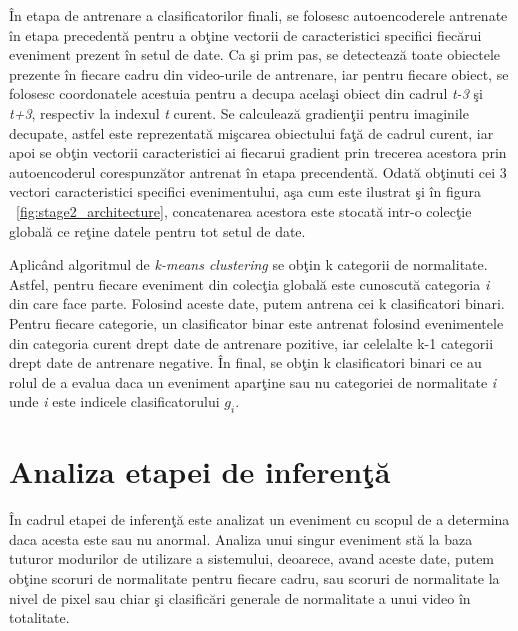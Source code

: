 \documentclass[a4paper,12pt]{report}
\begin{document}
\par
În etapa de antrenare a clasificatorilor finali, se folosesc autoencoderele antrenate în etapa precedentă pentru a obţine vectorii de caracteristici specifici fiecărui eveniment prezent în setul de date. Ca şi prim pas, se detectează toate obiectele prezente în fiecare cadru din video-urile  de antrenare, iar pentru fiecare obiect, se folosesc coordonatele acestuia pentru a decupa acelaşi obiect din cadrul \emph{t-3} şi \emph{t+3}, respectiv la indexul \emph{t} curent. Se calculează gradienţii pentru imaginile decupate, astfel este reprezentată mişcarea obiectului faţă de cadrul curent, iar apoi se obţin vectorii caracteristici ai fiecarui gradient prin trecerea acestora prin autoencoderul corespunzător antrenat în etapa precendentă. Odată obţinuti cei 3 vectori caracteristici specifici evenimentului, aşa cum este ilustrat şi în figura ~\ref{fig:stage2_architecture}, concatenarea acestora este stocată intr-o colecţie globală ce reţine datele pentru tot setul de date.
\par
Aplicând algoritmul de \emph{k-means clustering} se obţin k categorii de normalitate. Astfel, pentru fiecare eveniment din colecţia globală este cunoscută categoria \emph{i} din care face parte. Folosind aceste date, putem antrena cei k clasificatori binari. Pentru fiecare categorie, un clasificator binar este antrenat folosind evenimentele din categoria curent drept date de antrenare pozitive, iar celelalte k-1 categorii drept date de antrenare negative. În final, se obţin k clasificatori binari ce au rolul de a evalua daca un eveniment aparţine sau nu categoriei de normalitate \emph{i} unde \emph{i} este indicele clasificatorului 
\emph{\(g_{i}\)}. 

\section{Analiza etapei de inferenţă}
În cadrul etapei de inferenţă este analizat un eveniment cu scopul de a determina daca acesta este sau nu anormal. Analiza unui singur eveniment stă la baza tuturor modurilor de utilizare a sistemului, deoarece, avand aceste date, putem obţine scoruri de normalitate pentru fiecare cadru, sau scoruri de normalitate la nivel de pixel sau chiar şi clasificări generale de normalitate a unui video în totalitate.
\end{document}
